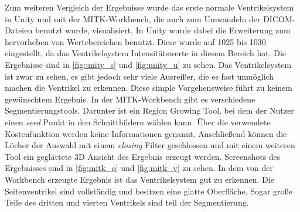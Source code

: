 Zum weiteren Vergleich der Ergebnisse wurde das erste normale Ventrikelsystem in Unity und mit der MITK-Workbench, die auch zum Umwandeln der DICOM-Dateien benutzt wurde, visualisiert.
\newline
In Unity wurde dabei die Erweiterung zum hervorheben von Wertebereichen benutzt. Diese wurde auf 1025 bis 1030 eingestellt, da das Ventrikelsystem Intensitätswerte in diesem Bereich hat. Die Ergebnisse sind in \autoref{fig:unity_s} und \autoref{fig:unity_u} zu sehen.
\newline
Das Ventrikelsystem ist zwar zu sehen, es gibt jedoch sehr viele Ausreißer, die es fast unmöglich machen die Ventrikel zu erkennen. Diese simple Vorgehensweise führt zu keinem gewünschtem Ergebnis.
\newline
In der MITK-Workbench gibt es verschiedene Segmentierungstools. Darunter ist ein Region Growing Tool, bei dem der Nutzer einen \textit{seed} Punkt in den Schnittbildern wählen kann. Über die verwendete Kostenfunktion werden keine Informationen genannt. Anschließend können die Löcher der Auswahl mit einem \textit{closing} Filter geschlossen und mit einem weiteren Tool ein geglättete 3D Ansicht des Ergebnis erzeugt werden. Screenshots des Ergebnisses sind in \autoref{fig:mitk_o} und \autoref{fig:mitk_v} zu sehen.
\newline
In dem von der Workbench erzeugte Ergebnis ist das Ventrikelsystem gut zu erkennen. Die Seitenventrikel sind vollständig und besitzen eine glatte Oberfläche. Sogar große Teile des dritten und vierten Ventrikels sind teil der Segmentierung.



